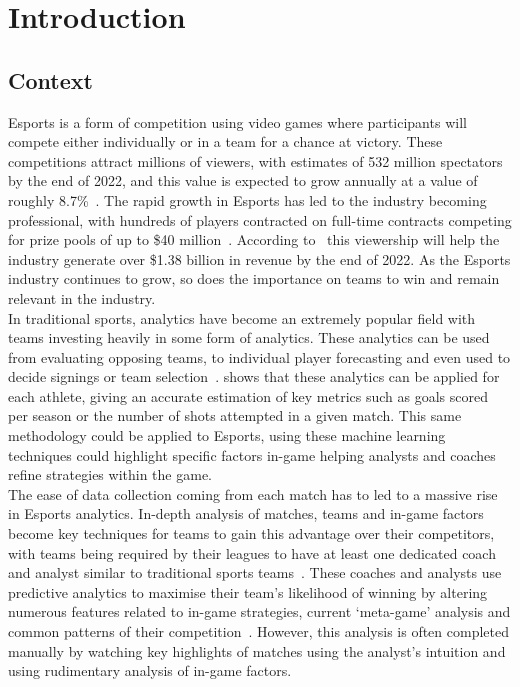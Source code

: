 \chapter{Introduction}\label{ch:introduction}

\section{Context}\label{sec:Context}

Esports is a form of competition using video games where participants will compete either individually or in a team for a chance at victory.
These competitions attract millions of viewers, with estimates of 532 million spectators by the end of 2022, and this value is expected to grow annually at a value of roughly 8.7\%~\citep{newzoo2022viewers}.
The rapid growth in Esports has led to the industry becoming professional, with hundreds of players contracted on full-time contracts competing for prize pools of up to \$40 million~\citep{esportsearnings}.
According to~\citet{newzoo2022viewers} this viewership will help the industry generate over \$1.38 billion in revenue by the end of 2022.
As the Esports industry continues to grow, so does the importance on teams to win and remain relevant in the industry.\\

In traditional sports, analytics have become an extremely popular field with teams investing heavily in some form of analytics.
These analytics can be used from evaluating opposing teams, to individual player forecasting and even used to decide signings or team selection~\citep{sarlis2020sports, apostolou2019sports}.
\citet{apostolou2019sports, sarlis2020sports} shows that these analytics can be applied for each athlete, giving an accurate estimation of key metrics such as goals scored per season or the number of shots attempted in a given match.
This same methodology could be applied to Esports, using these machine learning techniques could highlight specific factors in-game helping analysts and coaches refine strategies within the game.\\

The ease of data collection coming from each match has to led to a massive rise in Esports analytics.
In-depth analysis of matches, teams and in-game factors become key techniques for teams to gain this advantage over their competitors, with teams being required by their leagues to have at least one dedicated coach and analyst similar to traditional sports teams~\citep{LCSRules}.
These coaches and analysts use predictive analytics to maximise their team's likelihood of winning by altering numerous features related to in-game strategies, current `meta-game' analysis and common patterns of their competition~\citep{kokkinakis2021metagaming}.
However, this analysis is often completed manually by watching key highlights of matches using the analyst's intuition and using rudimentary analysis of in-game factors.\\

